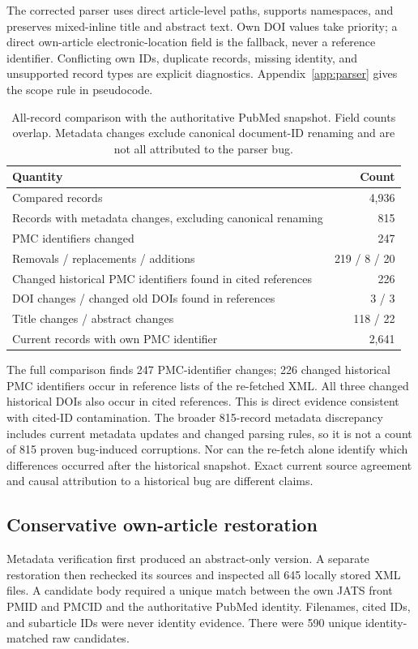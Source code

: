 \documentclass{article}
\begin{document}
The corrected parser uses direct article-level paths, supports namespaces, and preserves mixed-inline title and abstract text. Own DOI values take priority; a direct own-article electronic-location field is the fallback, never a reference identifier. Conflicting own IDs, duplicate records, missing identity, and unsupported record types are explicit diagnostics. Appendix~\ref{app:parser} gives the scope rule in pseudocode.

\begin{table}[t]
\centering
\caption{All-record comparison with the authoritative PubMed snapshot. Field counts overlap. Metadata changes exclude canonical document-ID renaming and are not all attributed to the parser bug.}
\label{tab:identity}
\begin{tabular}{@{}lr@{}}
\toprule
Quantity & Count \\
\midrule
Compared records & 4,936 \\
Records with metadata changes, excluding canonical renaming & 815 \\
PMC identifiers changed & 247 \\
\quad Removals / replacements / additions & 219 / 8 / 20 \\
Changed historical PMC identifiers found in cited references & 226 \\
DOI changes / changed old DOIs found in references & 3 / 3 \\
Title changes / abstract changes & 118 / 22 \\
Current records with own PMC identifier & 2,641 \\
\bottomrule
\end{tabular}
\end{table}

The full comparison finds 247 PMC-identifier changes; 226 changed historical PMC identifiers occur in reference lists of the re-fetched XML. All three changed historical DOIs also occur in cited references. This is direct evidence consistent with cited-ID contamination. The broader 815-record metadata discrepancy includes current metadata updates and changed parsing rules, so it is not a count of 815 proven bug-induced corruptions. Nor can the re-fetch alone identify which differences occurred after the historical snapshot. Exact current source agreement and causal attribution to a historical bug are different claims.

\subsection{Conservative own-article restoration}
Metadata verification first produced an abstract-only version. A separate restoration then rechecked its sources and inspected all 645 locally stored XML files. A candidate body required a unique match between the own JATS front PMID and PMCID and the authoritative PubMed identity. Filenames, cited IDs, and subarticle IDs were never identity evidence. There were 590 unique identity-matched raw candidates.
\end{document}
